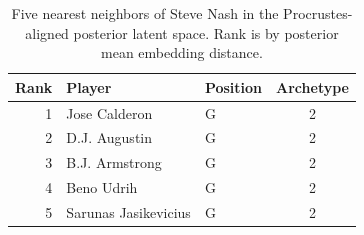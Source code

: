 \begin{table}[htbp]
  \centering\small
  \begin{tabular}{rllc}
    \toprule
    Rank & Player & Position & Archetype \\
    \midrule
    1 & Jose Calderon & G & 2 \\
    2 & D.J. Augustin & G & 2 \\
    3 & B.J. Armstrong & G & 2 \\
    4 & Beno Udrih & G & 2 \\
    5 & Sarunas Jasikevicius & G & 2 \\
    \bottomrule
  \end{tabular}
  \caption{Five nearest neighbors of Steve Nash in the Procrustes-aligned posterior latent space. Rank is by posterior mean embedding distance.}
  \label{tab:Steve_Nash_neighbors}
\end{table}

